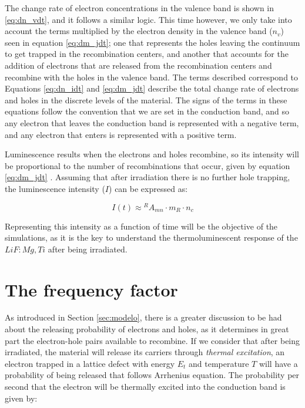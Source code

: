 \vspace{10pt}
The change rate of electron concentrations in the valence band is shown in \ref{eq:dn_vdt}, and it follows a similar logic. This time however, we only take into account the terms multiplied by the electron density in the valence band ($n_v$) seen in equation \ref{eq:dm_jdt}; one that represents the holes leaving the continuum to get trapped in the recombination centers, and another that accounts for the addition of electrons that are released from the recombination centers and recombine with the holes in the valence band. The terms described correspond to Equations \ref{eq:dn_idt} and \ref{eq:dm_jdt} describe the total change rate of electrons and holes in the discrete levels of the material. The signs of the terms in these equations follow the convention that we are set in the conduction band, and so any electron that leaves the conduction band is represented with a negative term, and any electron that enters is represented with a positive term.

\vspace{10pt}
Luminescence results when the electrons and holes recombine, so its intensity will be proportional to the number of recombinations that occur, given by equation \ref{eq:dm_jdt} \cite{mckeever_course_2022}. Assuming that after irradiation there is no further hole trapping, the luminescence intensity ($I$) can be expressed as:

\begin{equation} \label{eq:intensity}
  I(t) \approx {}^RA_{mn} \cdot m_R \cdot n_c
\end{equation}

\vspace{10pt}
Representing this intensity as a function of time will be the objective of the simulations, as it is the key to understand the thermoluminescent response of the $LiF:M\!g,Ti$ after being irradiated.




\section{The frequency factor} \label{sec:factorfrecuencia}

As introduced in Section \ref{sec:modelo}, there is a greater discussion to be had about the releasing probability of electrons and holes, as it determines in great part the electron-hole pairs available to recombine. If we consider that after being irradiated, the material will release its carriers through \textit{thermal excitation}, an electron trapped in a lattice defect with energy $E_t$ and temperature $T$ will have a probability of being released that follows Arrhenius equation. The probability per second that the electron will be thermally excited into the conduction band is given by:

